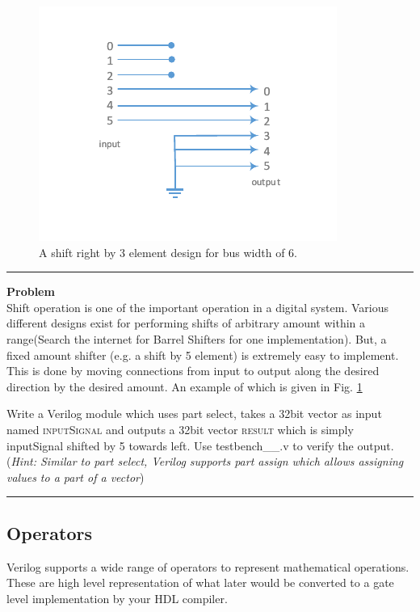 \documentclass[a4paper,10pt]{article}
\newcommand{\ano}{\text{1}}
\theoremstyle{mytheor}
\newcounter{problemNumber}
\newcommand {
  \insertProblem}[1]{
  \vspace{0.5cm}
  \hrule
  \vspace{0.3cm}

  {\color{greatblue}\textbf{\large{Problem \theproblemNumber}}}
  \vspace{2pt}\\#1

  \addtocounter{problemNumber}{1}
  \vspace{0.2cm}
  \hrule  
  \vspace{0.5cm}
}
\begin{document}
\begin{figure}[!h] \centering  
  \includegraphics[width=0.45\linewidth]{./resources/shiftUsingWires_representation.pdf}
  \caption{A shift right by 3 element design for bus width of 6.} 
  \label{Fig:shiftUsingWires-representation}
\end{figure}
\insertProblem{ Shift operation is one of the important operation in a digital system. Various different designs exist for performing shifts of arbitrary amount within a range(Search the internet for Barrel Shifters for one implementation). But, a fixed amount shifter (e.g. a shift by 5 element) is extremely easy to implement. This is done by moving connections from input to output along the desired direction by the desired amount. An example of which is given in Fig. \ref{Fig:shiftUsingWires-representation} 

  Write a Verilog module which uses part select, takes a 32bit vector as input named \textsc{inputSignal} and outputs a 32bit vector \textsc{result} which is simply inputSignal shifted by 5 towards left. Use {testbench\_{\ano}\_{\theproblemNumber}.v} to verify the output. (\textit{Hint: Similar to part select, Verilog supports part assign which allows assigning values to a part of a vector})}
%

\subsection*{Operators}
Verilog supports a wide range of operators to represent mathematical operations. These are high level representation of what later would be converted to a gate level implementation by your HDL compiler.
\end{document}

